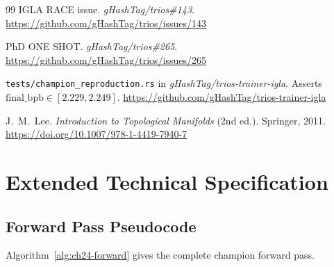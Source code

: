 \begin{thebibliography}{99}
  IGLA RACE issue. \textit{gHashTag/trios\#143}.
  \url{https://github.com/gHashTag/trios/issues/143}

  PhD ONE SHOT. \textit{gHashTag/trios\#265}.
  \url{https://github.com/gHashTag/trios/issues/265}

  \texttt{tests/champion\_reproduction.rs} in \textit{gHashTag/trios-trainer-igla}.
  Asserts $\mathrm{final\_bpb} \in [2.229, 2.249]$.
  \url{https://github.com/gHashTag/trios-trainer-igla}

  J.~M.~Lee.
  \textit{Introduction to Topological Manifolds} (2nd ed.).
  Springer, 2011.
  \url{https://doi.org/10.1007/978-1-4419-7940-7}

\end{thebibliography}


\section{Extended Technical Specification}
\label{sec:ch24-extended-spec}

\subsection{Forward Pass Pseudocode}
\label{subsec:ch24-pseudocode}

Algorithm~\ref{alg:ch24-forward} gives the complete champion forward pass.

